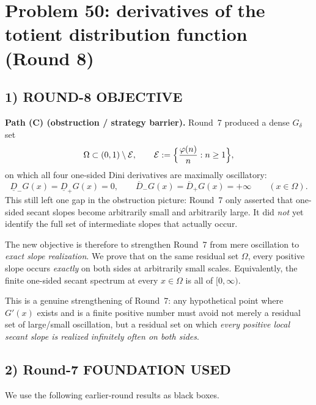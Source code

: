 \section{Problem 50: derivatives of the totient distribution function (Round 8)}

\subsection{1) ROUND-8 OBJECTIVE}

\textbf{Path (C) (obstruction / strategy barrier).}
Round~7 produced a dense $G_\delta$ set
\[
\Omega\subset (0,1)\setminus\mathcal E,
\qquad
\mathcal E:=\Bigl\{\frac{\varphi(n)}{n}:n\ge 1\Bigr\},
\]
on which all four one-sided Dini derivatives are maximally oscillatory:
\[
\underline D_-G(x)=\underline D_+G(x)=0,
\qquad
\overline D_-G(x)=\overline D_+G(x)=+\infty
\qquad(x\in\Omega).
\]
This still left one gap in the obstruction picture: Round~7 only asserted that one-sided secant slopes become arbitrarily small and arbitrarily large. It did \emph{not} yet identify the full set of intermediate slopes that actually occur.

The new objective is therefore to strengthen Round~7 from mere oscillation to \emph{exact slope realization}. We prove that on the same residual set $\Omega$, every positive slope occurs \emph{exactly} on both sides at arbitrarily small scales. Equivalently, the finite one-sided secant spectrum at every $x\in\Omega$ is all of $[0,\infty)$.

This is a genuine strengthening of Round~7: any hypothetical point where $G'(x)$ exists and is a finite positive number must avoid not merely a residual set of large/small oscillation, but a residual set on which \emph{every positive local secant slope is realized infinitely often on both sides}.

\subsection{2) Round-7 FOUNDATION USED}

We use the following earlier-round results as black boxes.

